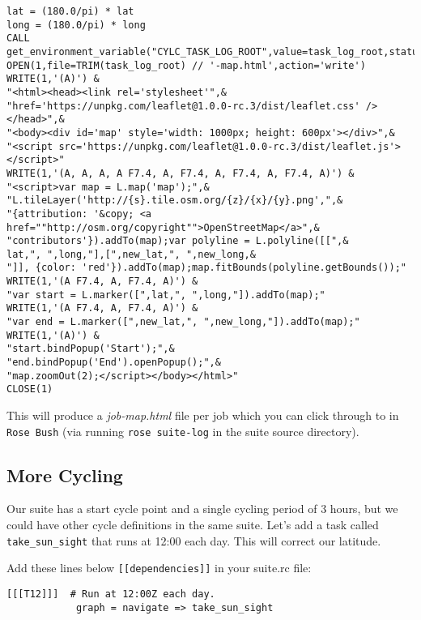 \lstset{language=Fortran}
\begin{lstlisting}[columns=fullflexible]
lat = (180.0/pi) * lat
long = (180.0/pi) * long
CALL get_environment_variable("CYLC_TASK_LOG_ROOT",value=task_log_root,status=code)
OPEN(1,file=TRIM(task_log_root) // '-map.html',action='write')
WRITE(1,'(A)') &
"<html><head><link rel='stylesheet'",&
"href='https://unpkg.com/leaflet@1.0.0-rc.3/dist/leaflet.css' /></head>",&
"<body><div id='map' style='width: 1000px; height: 600px'></div>",&
"<script src='https://unpkg.com/leaflet@1.0.0-rc.3/dist/leaflet.js'></script>"
WRITE(1,'(A, A, A, A F7.4, A, F7.4, A, F7.4, A, F7.4, A)') &
"<script>var map = L.map('map');",&
"L.tileLayer('http://{s}.tile.osm.org/{z}/{x}/{y}.png',",&
"{attribution: '&copy; <a href=""http://osm.org/copyright"">OpenStreetMap</a>",&
"contributors'}).addTo(map);var polyline = L.polyline([[",&
lat,", ",long,"],[",new_lat,", ",new_long,&
"]], {color: 'red'}).addTo(map);map.fitBounds(polyline.getBounds());"
WRITE(1,'(A F7.4, A, F7.4, A)') &
"var start = L.marker([",lat,", ",long,"]).addTo(map);"
WRITE(1,'(A F7.4, A, F7.4, A)') &
"var end = L.marker([",new_lat,", ",new_long,"]).addTo(map);"
WRITE(1,'(A)') &
"start.bindPopup('Start');",&
"end.bindPopup('End').openPopup();",&
"map.zoomOut(2);</script></body></html>"
CLOSE(1)
\end{lstlisting}


This will produce a {\em job-map.html} file per job which you can click through to in \lstinline{Rose Bush} (via running \lstinline{rose suite-log} in the
suite source directory).

\subsection{More Cycling}

Our suite has a start cycle point and a single cycling period of 3 hours, but we could have other cycle definitions in the same suite. Let's add a task called \lstinline{take_sun_sight} that runs at 12:00 each day. This will correct our latitude.

Add these lines below \lstinline{[[dependencies]]} in your suite.rc file:

\lstset{language=suiterc}
\begin{lstlisting}[columns=fullflexible]
        [[[T12]]]  # Run at 12:00Z each day.
            graph = navigate => take_sun_sight
\end{lstlisting}

